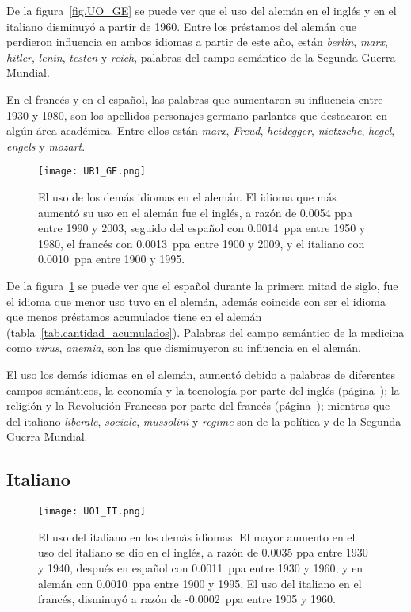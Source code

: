 De la figura~\ref{fig.UO_GE} se puede ver que el uso del alemán en el
inglés y en el italiano disminuyó a partir de 1960. Entre los préstamos del alemán que perdieron influencia en ambos idiomas a partir de este año, están \textit{berlin}, \textit{marx}, \textit{hitler}, \textit{lenin}, \textit{testen} y \textit{reich}, palabras del campo semántico de la Segunda Guerra Mundial. 

En el francés y en el español, las palabras que aumentaron su influencia entre 1930 y 1980,  son los apellidos personajes germano parlantes que destacaron en algún área académica. Entre ellos están \textit{marx}, \textit{Freud}, \textit{heidegger}, \textit{nietzsche}, \textit{hegel}, \textit{engels} y \textit{mozart}.

\label{GE-D}


\begin{figure}[h!]
	\centering
	\texttt{[image: UR1\_GE.png]}
	\caption{El uso de los demás idiomas en el alemán. El idioma que más aumentó su uso en el alemán fue el inglés, a razón de 0.0054 ppa  entre 1990 y 2003, seguido del español con 0.0014~ppa entre 1950 y 1980, el francés con 0.0013~ppa entre 1900 y 2009, y el italiano con 0.0010~ppa entre 1900 y 1995.}
	\label{fig.UR_GE}
\end{figure}

De la figura~\ref{fig.UR_GE} se puede ver que el español durante la primera mitad de siglo, fue el idioma que menor uso tuvo en el alemán, además coincide con ser el idioma que menos préstamos acumulados tiene en el alemán (tabla~\ref{tab.cantidad_acumulados}). Palabras del campo semántico de la medicina como \textit{virus}, \textit{anemia}, son las que disminuyeron su influencia en el alemán. 

El uso los demás idiomas en el alemán, aumentó debido a palabras de diferentes campos semánticos, la  economía y la tecnología  por parte del inglés (página~\pageref{EN-D}); la religión y la Revolución Francesa por parte del francés (página~\pageref{FR-D}); mientras que del italiano 
\textit{liberale}, \textit{sociale}, \textit{mussolini} y  \textit{regime} 
son de la política y  de la Segunda Guerra Mundial.

\label{D-GE}

\subsection{Italiano} %

\begin{figure}[h!]
	\centering
	\texttt{[image: UO1\_IT.png]}
	\caption{El uso del italiano en los demás idiomas. El mayor aumento en el uso del italiano se dio en el inglés, a razón de 0.0035 ppa entre 1930 y 1940, después en español con 0.0011~ppa entre 1930 y 1960, y en alemán con 0.0010~ppa entre 1900 y 1995. El uso del italiano en el francés, disminuyó a razón de -0.0002~ppa  entre 1905 y 1960.}
	\label{fig.UO_IT}
\end{figure}
	
